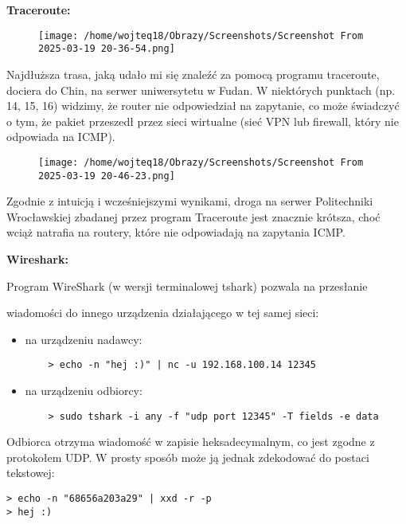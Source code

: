 \documentclass{article}
\begin{document}
\vspace{1\baselineskip}
\textbf{Traceroute:}

\begin{figure}[htbp]
  \centering
  \texttt{[image: /home/wojteq18/Obrazy/Screenshots/Screenshot From 2025-03-19 20-36-54.png]}
  \label{fig:traceroute_china}
\end{figure}

Najdłuższa trasa, jaką udało mi się znaleźć za pomocą programu traceroute, dociera do Chin, na serwer uniwersytetu w Fudan. 
W niektórych punktach (np. 14, 15, 16) widzimy, że router nie odpowiedział na zapytanie, co może świadczyć o tym, że pakiet przeszedł przez sieci wirtualne
(sieć VPN lub firewall, który nie odpowiada na ICMP).

\begin{figure}[htbp]
  \centering
  \texttt{[image: /home/wojteq18/Obrazy/Screenshots/Screenshot From 2025-03-19 20-46-23.png]}
  \label{fig:traceroute_poland}
\end{figure}

Zgodnie z intuicją i wcześniejszymi wynikami, droga na serwer Politechniki Wrocławskiej zbadanej przez program Traceroute jest znacznie krótsza,
choć wciąż natrafia na routery, które nie odpowiadają na zapytania ICMP.

\vspace{1\baselineskip}
\textbf{Wireshark:}

Program WireShark (w wersji terminalowej tshark) pozwala na przesłanie \par wiadomości do innego urządzenia działającego w tej samej sieci:
\begin{itemize}
  \item na urządzeniu nadawcy:
  \begin{verbatim}
    > echo -n "hej :)" | nc -u 192.168.100.14 12345
  \end{verbatim}
  \item na urządzeniu odbiorcy:
  \begin{verbatim}
    > sudo tshark -i any -f "udp port 12345" -T fields -e data
  \end{verbatim}
\end{itemize}

Odbiorca otrzyma wiadomość w zapisie heksadecymalnym, co jest zgodne z protokołem UDP. 
W prosty sposób może ją jednak zdekodować do postaci tekstowej:
\begin{verbatim}
> echo -n "68656a203a29" | xxd -r -p
> hej :)
\end{verbatim}
\end{document}
